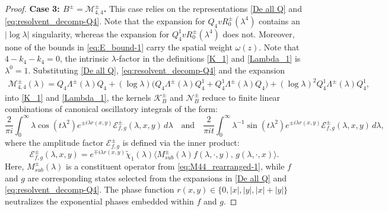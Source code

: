\documentclass[10pt,a4paper]{amsart}
\begin{document}
\begin{proof}
	
	\textbf{Case 3: $B^\pm=\mathcal{M}_{4,4}^\pm$.}
	This case  relies on the representations \eqref{De all Q} and \eqref{eq:resolvent_decomp-Q4}.
	Note that the expansion for $Q_4v R_0^\pm(\lambda^4)$ contains an $|\log\lambda|$ singularity, whereas the expansion for $Q_{4}^1v R_0^\pm(\lambda^4)$ does not. Moreover, none of the bounds in \eqref{eq:E_bound-1} carry the spatial weight $\omega(z)$.
	Note that  $4-k_4-k_4=0$, the intrinsic $\lambda$-factor in the definitions \eqref{K_1} and \eqref{Lambda_1} is $\lambda^0 = 1$.
Substituting  \eqref{De all Q}, \eqref{eq:resolvent_decomp-Q4} and  the  expansion 
		\begin{align}\label{eq:M44_rearranged-1}
		\mathcal{M}_{4,4}^{\pm}(\lambda) = Q_{4} \Lambda^\pm(\lambda) Q_{4} + (\log\lambda)\bigl(Q_{4} \Lambda^\pm(\lambda) Q_{4}^1+Q_{4}^1 \Lambda^\pm(\lambda) Q_{4}\bigr) + (\log\lambda)^2 Q_{4}^1 \Lambda^\pm(\lambda)Q_{4}^1,
	\end{align}
	 into \eqref{K_1} and \eqref{Lambda_1}, the kernels $\mathcal{K}_B^\pm$ and $\mathcal{N}_B^\pm$ reduce to finite linear combinations of canonical oscillatory integrals of the form:
	\begin{equation}\label{eq:canonical_oscillatory_prop1}
		\frac{2}{\pi i}	\int_0^\infty \lambda \cos(t\lambda^2) e^{\pm i\lambda r(x,y)} \mathcal{E}_{f,g}^\pm(\lambda, x, y) \, d\lambda \quad \text{and} \quad
		\frac{2}{\pi it} \int_0^\infty \lambda^{-1} \sin(t\lambda^2) e^{\pm i\lambda r(x,y)} \mathcal{E}_{f,g}^\pm(\lambda, x, y) \, d\lambda,
	\end{equation}
	where the amplitude factor $\mathcal{E}_{f,g}^\pm$ is defined via the inner product:
	\begin{equation}\label{eq:amplitude_def_prop1}
		\mathcal{E}_{f,g}^\pm(\lambda, x, y) = e^{\mp i\lambda r(x,y)} \widetilde{\chi}_1(\lambda) \big\langle M_{sub}^\pm(\lambda) f(\lambda, \cdot, y), \, g(\lambda, \cdot, x) \big\rangle.
	\end{equation}
	Here, $M_{sub}^\pm(\lambda)$ is a constituent operator from \eqref{eq:M44_rearranged-1}, while $f$ and $g$ are corresponding states selected from the expansions in \eqref{De all Q} and \eqref{eq:resolvent_decomp-Q4}. The phase function $r(x,y) \in \{0, |x|, |y|, |x|+|y|\}$ neutralizes the exponential phases embedded within $f$ and $g$.


\end{proof}
\end{document}
